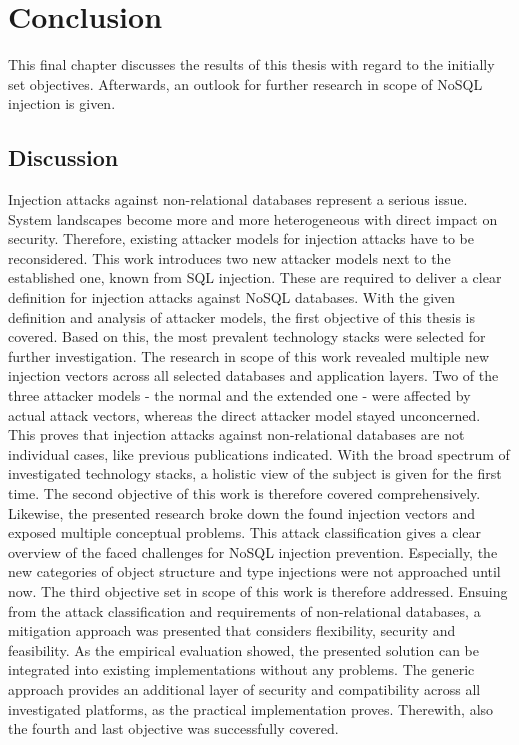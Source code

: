 \chapter{Conclusion}
This final chapter discusses the results of this thesis with regard to the initially set objectives. Afterwards, an outlook for further research in scope of NoSQL injection is given.

\section{Discussion}
Injection attacks against non-relational databases represent a serious issue. System landscapes become more and more heterogeneous with direct impact on security. Therefore, existing attacker models for injection attacks have to be reconsidered. This work introduces two new attacker models next to the established one, known from SQL injection. These are required to deliver a clear definition for injection attacks against NoSQL databases. With the given definition and analysis of attacker models, the first objective of this thesis is covered. Based on this, the most prevalent technology stacks were selected for further investigation. The research in scope of this work revealed multiple new injection vectors across all selected databases and application layers. Two of the three attacker models - the normal and the extended one - were affected by actual attack vectors, whereas the direct attacker model stayed unconcerned. This proves that injection attacks against non-relational databases are not individual cases, like previous publications indicated. With the broad spectrum of investigated technology stacks, a holistic view of the subject is given for the first time. The second objective of this work is therefore covered comprehensively. Likewise, the presented research broke down the found injection vectors and exposed multiple conceptual problems. This attack classification gives a clear overview of the faced challenges for NoSQL injection prevention. Especially, the new categories of object structure and type injections were not approached until now. The third objective set in scope of this work is therefore addressed. Ensuing from the attack classification and requirements of non-relational databases, a mitigation approach was presented that considers flexibility, security and feasibility. As the empirical evaluation showed, the presented solution can be integrated into existing implementations without any problems. The generic approach provides an additional layer of security and compatibility across all investigated platforms, as the practical implementation proves. Therewith, also the fourth and last objective was successfully covered. \\

